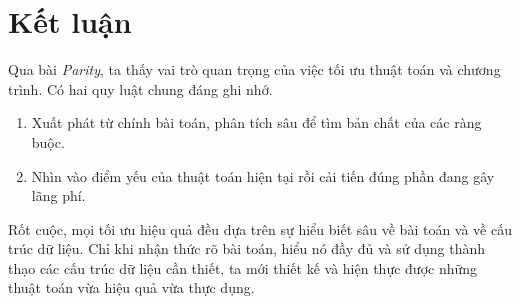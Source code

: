 \documentclass[11pt]{article}
\begin{document}
\section{Kết luận}

Qua bài \textit{Parity}, ta thấy vai trò quan trọng của việc tối ưu thuật
toán và chương trình. Có hai quy luật chung đáng ghi nhớ.

\begin{enumerate}
  \item Xuất phát từ chính bài toán, phân tích sâu để tìm bản chất của các
  ràng buộc.
  \item Nhìn vào điểm yếu của thuật toán hiện tại rồi cải tiến đúng phần đang
  gây lãng phí.
\end{enumerate}

Rốt cuộc, mọi tối ưu hiệu quả đều dựa trên sự hiểu biết sâu về bài toán và về
cấu trúc dữ liệu. Chỉ khi nhận thức rõ bài toán, hiểu nó đầy đủ và sử dụng
thành thạo các cấu trúc dữ liệu cần thiết, ta mới thiết kế và hiện thực được
những thuật toán vừa hiệu quả vừa thực dụng.
\end{document}
